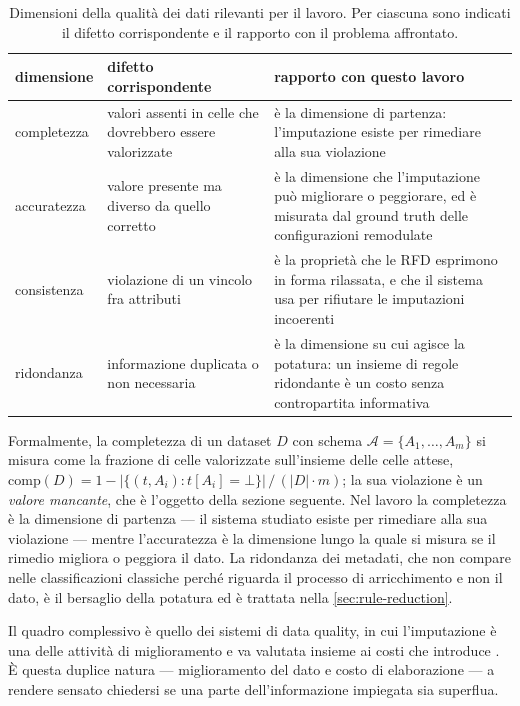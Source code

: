 \begin{table}[htbp]
\centering
\caption{Dimensioni della qualità dei dati rilevanti per il lavoro. Per ciascuna sono indicati il
difetto corrispondente e il rapporto con il problema affrontato.}
\label{tab:dq-dimensions}
\footnotesize
\begin{tabular}{@{}lp{3.6cm}p{4.6cm}@{}}
\toprule
dimensione & difetto corrispondente & rapporto con questo lavoro \\
\midrule
completezza & valori assenti in celle che dovrebbero essere valorizzate & è la dimensione di
partenza: l'imputazione esiste per rimediare alla sua violazione \\
accuratezza & valore presente ma diverso da quello corretto & è la dimensione che l'imputazione
può migliorare o peggiorare, ed è misurata dal ground truth delle configurazioni remodulate \\
consistenza & violazione di un vincolo fra attributi & è la proprietà che le RFD esprimono in
forma rilassata, e che il sistema usa per rifiutare le imputazioni incoerenti \\
ridondanza & informazione duplicata o non necessaria & è la dimensione su cui agisce la potatura:
un insieme di regole ridondante è un costo senza contropartita informativa \\
\bottomrule
\end{tabular}
\end{table}

Formalmente, la completezza di un dataset $D$ con schema $\mathcal{A} = \{A_1, \dots, A_m\}$ si
misura come la frazione di celle valorizzate sull'insieme delle celle attese,
$\mathrm{comp}(D) = 1 - |\{(t, A_i) : t[A_i] = \bot\}| \,/\, (|D| \cdot m)$; la sua violazione è
un \emph{valore mancante}, che è l'oggetto della sezione seguente. Nel lavoro la completezza è la
dimensione di partenza --- il sistema studiato esiste per rimediare alla sua violazione --- mentre
l'accuratezza è la dimensione lungo la quale si misura se il rimedio migliora o peggiora il dato.
La ridondanza dei metadati, che non compare nelle classificazioni classiche perché riguarda il
processo di arricchimento e non il dato, è il bersaglio della potatura ed è trattata nella
\autoref{sec:rule-reduction}.

Il quadro complessivo è quello dei sistemi di data quality, in cui l'imputazione è una delle
attività di miglioramento e va valutata insieme ai costi che introduce \cite{batini2016data}. È
questa duplice natura --- miglioramento del dato e costo di elaborazione --- a rendere sensato
chiedersi se una parte dell'informazione impiegata sia superflua.

